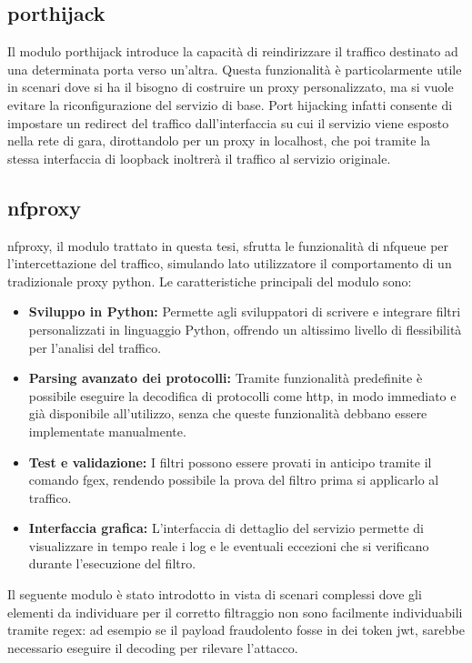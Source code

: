 \subsection{porthijack}
Il modulo \gls{porthijack} introduce la capacità di reindirizzare il traffico destinato ad una determinata porta verso un’altra. Questa funzionalità è particolarmente utile in scenari dove si ha il bisogno di costruire un proxy personalizzato, ma si vuole evitare la riconfigurazione del servizio di base. Port hijacking infatti consente di impostare un redirect del traffico dall'interfaccia su cui il servizio viene esposto nella rete di gara, dirottandolo per un proxy in localhost, che poi tramite la stessa interfaccia di loopback inoltrerà il traffico al servizio originale.

\subsection{nfproxy}
\gls{nfproxy}, il modulo trattato in questa tesi, sfrutta le funzionalità di \gls{nfqueue} per l'intercettazione del traffico, simulando lato utilizzatore il comportamento di un tradizionale proxy python. Le caratteristiche principali del modulo sono:
\begin{itemize}
    \setlength{\itemsep}{1pt}
    \setlength{\parskip}{1pt}
    \item \textbf{Sviluppo in Python:} Permette agli sviluppatori di scrivere e integrare filtri personalizzati in linguaggio Python, offrendo un altissimo livello di flessibilità per l'analisi del traffico.
    \item \textbf{Parsing avanzato dei protocolli:} Tramite funzionalità predefinite è possibile eseguire la decodifica di protocolli come \gls{http}, in modo immediato e già disponibile all'utilizzo, senza che queste funzionalità debbano essere implementate manualmente.
    \item \textbf{Test e validazione:} I filtri possono essere provati in anticipo tramite il comando fgex, rendendo possibile la prova del filtro prima si applicarlo al traffico.
    \item \textbf{Interfaccia grafica:} L'interfaccia di dettaglio del servizio permette di visualizzare in tempo reale i log e le eventuali eccezioni che si verificano durante l'esecuzione del filtro.
\end{itemize}

Il seguente modulo è stato introdotto in vista di scenari complessi dove gli elementi da individuare per il corretto filtraggio non sono facilmente individuabili tramite \gls{regex}: ad esempio se il payload fraudolento fosse in dei token \gls{jwt}, sarebbe necessario eseguire il decoding per rilevare l'attacco.

